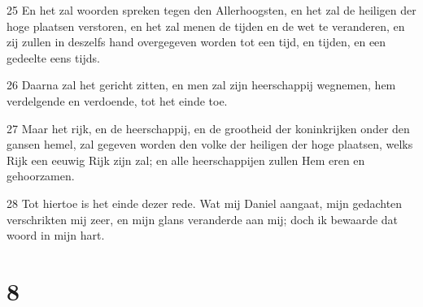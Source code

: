 \par 25 En het zal woorden spreken tegen den Allerhoogsten, en het zal de heiligen der hoge plaatsen verstoren, en het zal menen de tijden en de wet te veranderen, en zij zullen in deszelfs hand overgegeven worden tot een tijd, en tijden, en een gedeelte eens tijds.
\par 26 Daarna zal het gericht zitten, en men zal zijn heerschappij wegnemen, hem verdelgende en verdoende, tot het einde toe.
\par 27 Maar het rijk, en de heerschappij, en de grootheid der koninkrijken onder den gansen hemel, zal gegeven worden den volke der heiligen der hoge plaatsen, welks Rijk een eeuwig Rijk zijn zal; en alle heerschappijen zullen Hem eren en gehoorzamen.
\par 28 Tot hiertoe is het einde dezer rede. Wat mij Daniel aangaat, mijn gedachten verschrikten mij zeer, en mijn glans veranderde aan mij; doch ik bewaarde dat woord in mijn hart.

\chapter{8}

